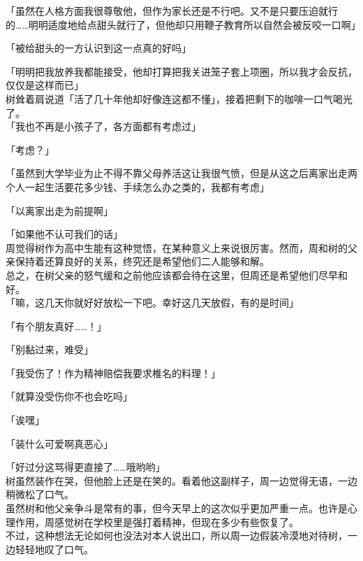 「虽然在人格方面我很尊敬他，但作为家长还是不行吧。又不是只要压迫就行的……明明适度地给点甜头就行了，但他却只用鞭子教育所以自然会被反咬一口啊」

「被给甜头的一方认识到这一点真的好吗」

「明明把我放养我都能接受，他却打算把我关进笼子套上项圈，所以我才会反抗，仅仅是这样而已」\\

树耸着肩说道「活了几十年他却好像连这都不懂」，接着把剩下的咖啡一口气喝光了。\\

「我也不再是小孩子了，各方面都有考虑过」

「考虑？」

「虽然到大学毕业为止不得不靠父母养活这让我很气愤，但是从这之后离家出走两个人一起生活要花多少钱、手续怎么办之类的，我都有考虑」

「以离家出走为前提啊」

「如果他不认可我们的话」\\

周觉得树作为高中生能有这种觉悟，在某种意义上来说很厉害。然而，周和树的父亲保持着还算良好的关系，终究还是希望他们二人能够和解。\\

总之，在树父亲的怒气缓和之前他应该都会待在这里，但周还是希望他们尽早和好。\\

「嘛，这几天你就好好放松一下吧。幸好这几天放假，有的是时间」

「有个朋友真好……！」

「别黏过来，难受」

「我受伤了！作为精神赔偿我要求椎名的料理！」

「就算没受伤你不也会吃吗」

「诶嘿」

「装什么可爱啊真恶心」

「好过分这骂得更直接了……哦哟哟」\\

树虽然装作在哭，但他脸上还是在笑的。看着他这副样子，周一边觉得无语，一边稍微松了口气。\\

虽然树和他父亲争斗是常有的事，但今天早上的这次似乎更加严重一点。也许是心理作用，周感觉树在学校里是强打着精神，但现在多少有些恢复了。\\

不过，这种想法无论如何也没法对本人说出口，所以周一边假装冷漠地对待树，一边轻轻地叹了口气。\\

